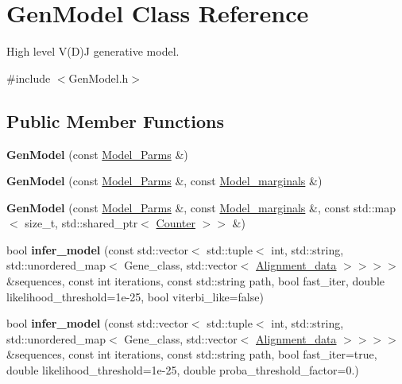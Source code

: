 \hypertarget{classGenModel}{}\section{Gen\+Model Class Reference}
\label{classGenModel}


High level V(\+D)J generative model.  




{\ttfamily \#include $<$Gen\+Model.\+h$>$}

\subsection*{Public Member Functions}
\begin{DoxyCompactItemize}
\item 
\mbox{\label{classGenModel_a6f196dae8f76a8042561af9e8b4ce132}} 
{\bfseries Gen\+Model} (const \hyperlink{classModel__Parms}{Model\+\_\+\+Parms} \&)
\item 
\mbox{\label{classGenModel_aaea2a3f119e50a2011022a63c47021ee}} 
{\bfseries Gen\+Model} (const \hyperlink{classModel__Parms}{Model\+\_\+\+Parms} \&, const \hyperlink{classModel__marginals}{Model\+\_\+marginals} \&)
\item 
\mbox{\label{classGenModel_a7b885073eb010d69a07e1a18b062f330}} 
{\bfseries Gen\+Model} (const \hyperlink{classModel__Parms}{Model\+\_\+\+Parms} \&, const \hyperlink{classModel__marginals}{Model\+\_\+marginals} \&, const std\+::map$<$ size\+\_\+t, std\+::shared\+\_\+ptr$<$ \hyperlink{classCounter}{Counter} $>$$>$ \&)
\item 
\mbox{\label{classGenModel_a434080337f08b89ad939da5ff741f261}} 
bool {\bfseries infer\+\_\+model} (const std\+::vector$<$ std\+::tuple$<$ int, std\+::string, std\+::unordered\+\_\+map$<$ Gene\+\_\+class, std\+::vector$<$ \hyperlink{structAlignment__data}{Alignment\+\_\+data} $>$$>$$>$$>$ \&sequences, const int iterations, const std\+::string path, bool fast\+\_\+iter, double likelihood\+\_\+threshold=1e-\/25, bool viterbi\+\_\+like=false)
\item 
\mbox{\label{classGenModel_a80a7b9081e4214185e567c2c998412d6}} 
bool {\bfseries infer\+\_\+model} (const std\+::vector$<$ std\+::tuple$<$ int, std\+::string, std\+::unordered\+\_\+map$<$ Gene\+\_\+class, std\+::vector$<$ \hyperlink{structAlignment__data}{Alignment\+\_\+data} $>$$>$$>$$>$ \&sequences, const int iterations, const std\+::string path, bool fast\+\_\+iter=true, double likelihood\+\_\+threshold=1e-\/25, double proba\+\_\+threshold\+\_\+factor=0.)
$$
\end{DoxyCompactItemize}
